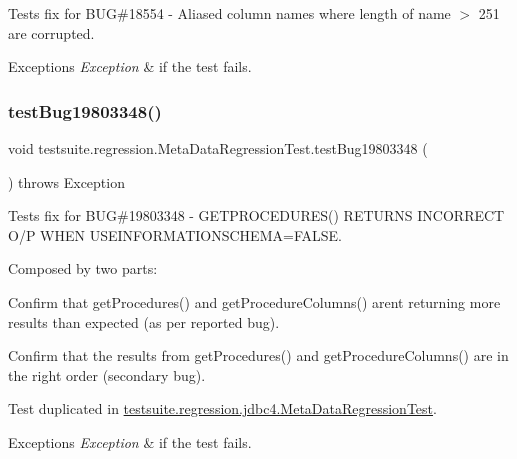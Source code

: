 Tests fix for B\+UG\#18554 -\/ Aliased column names where length of name $>$ 251 are corrupted.


\begin{DoxyExceptions}{Exceptions}
{\em Exception} & if the test fails. \\
\hline
\end{DoxyExceptions}
\mbox{\label{classtestsuite_1_1regression_1_1_meta_data_regression_test_ae07cbe1ade492b69942cdbb52c4ef65a}} 
\subsubsection{\texorpdfstring{test\+Bug19803348()}{testBug19803348()}}
{\footnotesize\ttfamily void testsuite.\+regression.\+Meta\+Data\+Regression\+Test.\+test\+Bug19803348 (\begin{DoxyParamCaption}{ }\end{DoxyParamCaption}) throws Exception}

Tests fix for B\+UG\#19803348 -\/ G\+E\+T\+P\+R\+O\+C\+E\+D\+U\+R\+E\+S() R\+E\+T\+U\+R\+NS I\+N\+C\+O\+R\+R\+E\+CT O/P W\+H\+EN U\+S\+E\+I\+N\+F\+O\+R\+M\+A\+T\+I\+O\+N\+S\+C\+H\+E\+MA=F\+A\+L\+SE.

Composed by two parts\+:
\begin{DoxyEnumerate}
\item Confirm that get\+Procedures() and get\+Procedure\+Columns() aren\textquotesingle{}t returning more results than expected (as per reported bug).
\item Confirm that the results from get\+Procedures() and get\+Procedure\+Columns() are in the right order (secondary bug).
\end{DoxyEnumerate}

Test duplicated in \mbox{\hyperlink{classtestsuite_1_1regression_1_1jdbc4_1_1_meta_data_regression_test}{testsuite.\+regression.\+jdbc4.\+Meta\+Data\+Regression\+Test}}.


\begin{DoxyExceptions}{Exceptions}
{\em Exception} & if the test fails. \\
\hline
\end{DoxyExceptions}
\mbox{\label{classtestsuite_1_1regression_1_1_meta_data_regression_test_ae79b95fa80f4d41af56448aa53d865bb}} 
